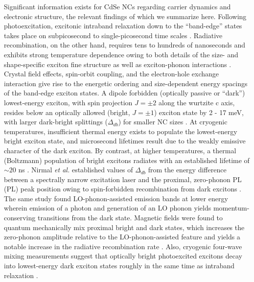 Significant information exists for CdSe NCs regarding carrier dynamics and electronic structure, the relevant findings of which we summarize here. Following photoexcitation, excitonic intraband relaxation down to the “band-edge” states takes place on subpicosecond to single-picosecond time scales \cite{PhysRevLett.80.4028, PhysRevB.60.R2181, PhysRevLett.96.057408}.  Radiative recombination, on the other hand, requires tens to hundreds of nanoseconds and exhibits strong temperature dependence owing to both details of the size- and shape-specific exciton fine structure as well as exciton-phonon interactions \cite{:/content/aip/journal/jcp/96/2/10.1063/1.462114, PhysRevLett.75.3728, PhysRevB.54.4843, PhysRevB.60.1819, :/content/aip/journal/apl/82/17/10.1063/1.1570923, doi:10.1021/jp051738b, PhysRevB.74.085320,PhysRevLett.102.177402}.  Crystal field effects, spin-orbit coupling, and the electron-hole exchange interaction \cite{PhysRevB.54.4843, PhysRevB.60.1819} give rise to the energetic ordering and size-dependent energy spacings of the band-edge exciton states. A dipole forbidden (optically passive or “dark”) lowest-energy exciton, with spin projection $J = \pm 2$ along the wurtzite c axis, resides below an optically allowed (bright, $J = \pm 1$) exciton state by 2 - 17 meV, with larger dark-bright splittings ($\Delta_{db}$) for smaller NC sizes \cite{PhysRevLett.75.3728}.  At cryogenic temperatures, insufficient thermal energy exists to populate the lowest-energy bright exciton state, and microsecond lifetimes result due to the weakly emissive character of the dark exciton. By contrast, at higher temperatures, a thermal (Boltzmann) population of bright excitons radiates with an established lifetime of $\sim 20$ ns \cite{:/content/aip/journal/apl/82/17/10.1063/1.1570923}.  Nirmal \emph{et al.} established values of $\Delta_{db}$ from the energy difference between a spectrally narrow excitation laser and the proximal, zero-phonon PL (PL) peak position owing to spin-forbidden recombination from dark excitons \cite{PhysRevLett.75.3728}.  The same study found LO-phonon-assisted emission bands at lower energy wherein emission of a photon and generation of an LO phonon yields momentum-conserving transitions from the dark state. Magnetic fields were found to quantum mechanically mix proximal bright and dark states, which increases the zero-phonon amplitude relative to the LO-phonon-assisted feature and yields a notable increase in the radiative recombination rate \cite{PhysRevLett.75.3728}.  Also, cryogenic four-wave mixing measurements suggest that optically bright photoexcited excitons decay into lowest-energy dark exciton states roughly in the same time as intraband relaxation \cite{PhysRevB.73.125322}.  \par

